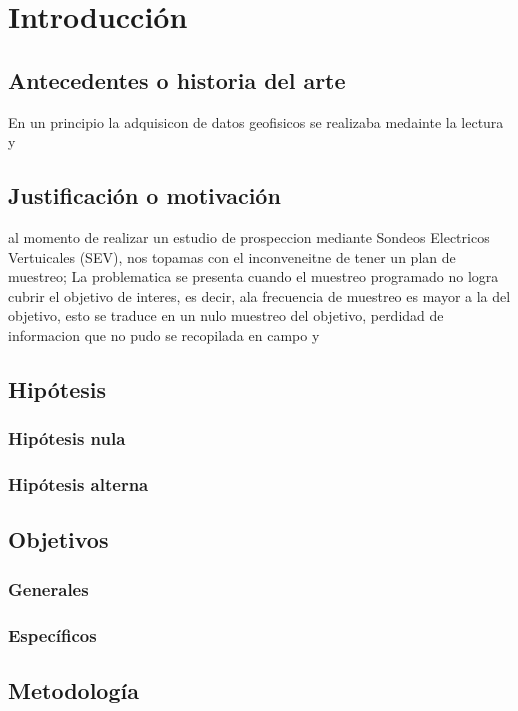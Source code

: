 \chapter{Introducción}

\section{Antecedentes o historia del arte}

En un principio la adquisicon de datos geofisicos se realizaba medainte la lectura y 

\section{Justificación o motivación}

al momento de realizar un estudio de prospeccion mediante Sondeos Electricos Vertuicales (SEV), nos topamas con el inconveneitne de tener un plan de muestreo;
La problematica se presenta cuando el muestreo programado no logra cubrir el objetivo de interes, es decir, ala frecuencia de muestreo es mayor a la del objetivo, esto se traduce en un nulo muestreo del objetivo, perdidad de informacion que no pudo se recopilada en campo y 
\section{Hipótesis}
\subsection{Hipótesis nula}
\subsection{Hipótesis alterna}

\section{Objetivos}

\subsection{Generales}

\subsection{Específicos}

\section{Metodología}



